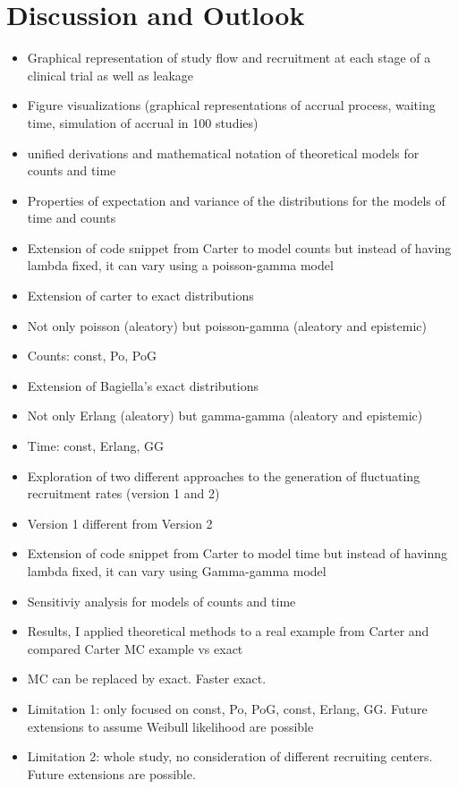 

\chapter{Discussion and Outlook}

\begin{itemize}
\item Graphical representation of study flow and recruitment at each stage of a clinical trial as well as leakage
\item Figure visualizations (graphical representations of accrual process, waiting time, simulation of accrual in 100 studies)
\item unified derivations and mathematical notation of theoretical models for counts and time
\item Properties of expectation and variance of the distributions for the models of time and counts
\item Extension of code snippet from Carter to model counts but instead of having lambda fixed, it can vary using a poisson-gamma model
\item Extension of carter to exact distributions
\item Not only poisson (aleatory) but poisson-gamma (aleatory and epistemic)
\item Counts: const, Po, PoG
\item Extension of Bagiella's exact distributions
\item Not only Erlang (aleatory) but gamma-gamma (aleatory and epistemic)
\item Time: const, Erlang, GG
\item Exploration of two different approaches to the generation of fluctuating recruitment rates (version 1 and 2)
\item Version 1 different from Version 2
\item Extension of code snippet from Carter to model time but instead of havinng lambda fixed, it can vary using Gamma-gamma model
\item Sensitiviy analysis for models of counts and time
\item Results, I applied theoretical methods to a real example from Carter and compared Carter MC example vs exact
\item MC can be replaced by exact. Faster exact.
\item Limitation 1: only focused on const, Po, PoG, const, Erlang, GG. Future extensions to assume Weibull likelihood are possible
\item Limitation 2: whole study, no consideration of different recruiting centers. Future extensions are possible.

\end{itemize}
